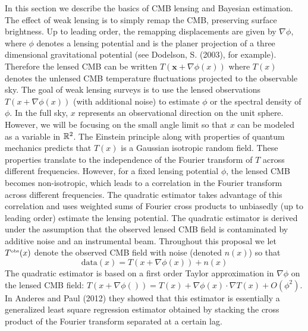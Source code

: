 \documentclass[noinfoline]{imsart}
\newcommand{\bx}{\boldsymbol x}
\newcommand{\bs}{\boldsymbol}
\begin{document}
In this section we describe the  basics of CMB lensing and Bayesian estimation.  The effect of weak lensing is to simply remap the CMB, preserving surface brightness.   Up to leading order, the remapping  displacements are given by $\nabla \phi$, where $\phi$ denotes a lensing potential and is the planer projection of a three dimensional gravitational potential (see Dodelson, S. (2003), for example). Therefore the lensed CMB can  be written $T(\bx + \nabla \phi(x))$ where $T(x)$ denotes the unlensed CMB temperature fluctuations projected to the observable sky.
The goal of weak lensing surveys is to use the lensed observations $T(x + \nabla \phi(x))$  (with additional noise) to  estimate $\phi$ or the spectral density of $\phi$.  In the full sky, $x$ represents an observational direction on the unit sphere. However, we will be focusing on the small angle limit  so that $x$ can be modeled as a variable in $ \Bbb R^2$.  The Einstein principle along with properties of quantum mechanics predicts that $T(x)$   is a Gaussian  isotropic random field. These properties translate to  the independence of the Fourier transform of $T$ across different frequencies.
 However, for a fixed lensing potential $\phi$, the lensed CMB  becomes non-isotropic, which leads to a correlation in the Fourier transform across different frequencies. The quadratic estimator   takes advantage of this correlation and uses weighted sums of Fourier  cross products to unbiasedly (up to leading order) estimate the lensing potential.
The quadratic estimator is derived under the assumption that the observed lensed CMB field is contaminated by additive noise and an instrumental beam. Throughout this proposal we let  $T^\text{\tiny obs}(x)$ denote the observed CMB field  with  noise (denoted $n(x)$) so that  
\[ \text{data}(x)= T(x + \nabla \phi(x))+ n(x)
 \]
The quadratic estimator is based on a first order Taylor approximation in $\nabla \phi $ on the lensed CMB field:
$T(x+\nabla \phi())= T(x) + \nabla \phi(x)\cdot \nabla T(x)+ O(\phi^2)$. 
In Anderes and Paul (2012) they showed that this estimator is essentially  a generalized least square regression estimator obtained by stacking the cross product of the Fourier transform separated at a certain lag.
\end{document}
